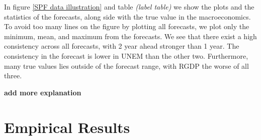 \documentclass[]{article}
\begin{document}
In figure \ref{SPF data illustration} and table \emph{(label table)} we
show the plots and the statistics of the forecasts, along side with the
true value in the macroeconomics. To avoid too many lines on the figure
by plotting all forecasts, we plot only the minimum, mean, and maximum
from the forecasts. We see that there exist a high consistency across
all forecasts, with 2 year ahead stronger than 1 year. The consistency
in the forecast is lower in UNEM than the other two. Furthermore, many
true values lies outside of the forecast range, with RGDP the worse of
all three.

\textbf{add more explanation}

\hypertarget{empirical-results}{%
\section{Empirical Results}\label{empirical-results}}
\end{document}

